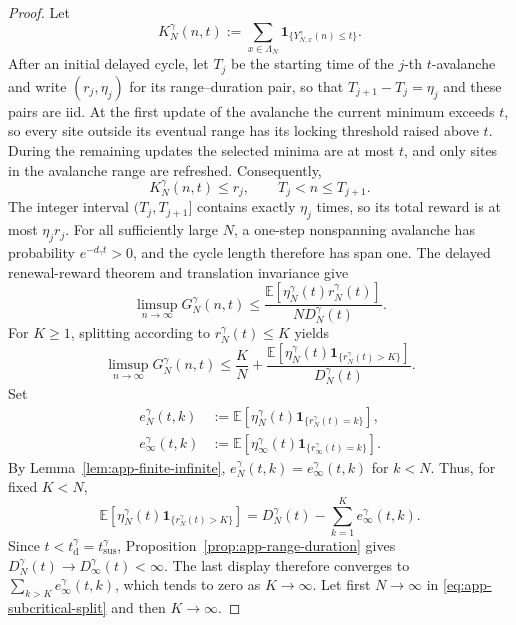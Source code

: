 \documentclass[11pt,a4paper]{amsart}
\theoremstyle{remark}
\begin{document}
\begin{proof}
Let
\[
        K_N^\gamma(n,t)
        :=
        \sum_{x\in\Lambda_N}
        \mathbf 1_{\{Y_{N,x}^\gamma(n)\leq t\}}.
\]
After an initial delayed cycle, let $T_j$ be the starting time of the
$j$-th $t$-avalanche and write $(r_j,\eta_j)$ for its range--duration
pair, so that $T_{j+1}-T_j=\eta_j$ and these pairs are iid. At the first
update of the avalanche the current minimum exceeds $t$, so every site
outside its eventual range has its locking threshold raised above $t$.
During the remaining updates the selected minima are at most $t$, and
only sites in the avalanche range are refreshed. Consequently,
\[
        K_N^\gamma(n,t)\leq r_j,
        \qquad T_j<n\leq T_{j+1}.
\]
The integer interval $(T_j,T_{j+1}]$ contains exactly $\eta_j$ times, so
its total reward is at most $\eta_jr_j$. For all sufficiently large
$N$, a one-step nonspanning avalanche has probability
$e^{-d_\gamma t}>0$, and the cycle length therefore has span one. The
delayed renewal-reward theorem and translation invariance give
\[
        \limsup_{n\to\infty}G_N^\gamma(n,t)
        \leq
        \frac{\mathbb{E}[\eta_N^\gamma(t)r_N^\gamma(t)]}
        {ND_N^\gamma(t)}.
\]
For $K\geq1$, splitting according to $r_N^\gamma(t)\leq K$ yields
\begin{equation}
\label{eq:app-subcritical-split}
        \limsup_{n\to\infty}G_N^\gamma(n,t)
        \leq
        \frac KN+
        \frac{
        \mathbb{E}[\eta_N^\gamma(t)
        \mathbf 1_{\{r_N^\gamma(t)>K\}}]}
        {D_N^\gamma(t)}.
\end{equation}
Set
\[
\begin{aligned}
        e_N^\gamma(t,k)
        &:=
        \mathbb{E}[\eta_N^\gamma(t)
        \mathbf 1_{\{r_N^\gamma(t)=k\}}],\\
        e_\infty^\gamma(t,k)
        &:=
        \mathbb{E}[\eta_\infty^\gamma(t)
        \mathbf 1_{\{r_\infty^\gamma(t)=k\}}].
\end{aligned}
\]
By Lemma~\ref{lem:app-finite-infinite},
$e_N^\gamma(t,k)=e_\infty^\gamma(t,k)$ for $k<N$. Thus, for fixed
$K<N$,
\[
        \mathbb{E}[\eta_N^\gamma(t)
        \mathbf 1_{\{r_N^\gamma(t)>K\}}]
        =
        D_N^\gamma(t)
        -\sum_{k=1}^Ke_\infty^\gamma(t,k).
\]
Since $t<t_{\mathrm d}^\gamma=t_{\mathrm{sus}}^\gamma$,
Proposition~\ref{prop:app-range-duration} gives
$D_N^\gamma(t)\to D_\infty^\gamma(t)<\infty$. The last display therefore
converges to $\sum_{k>K}e_\infty^\gamma(t,k)$, which tends to zero as
$K\to\infty$. Let first $N\to\infty$ in
\eqref{eq:app-subcritical-split} and then $K\to\infty$.
\end{proof}
\end{document}
